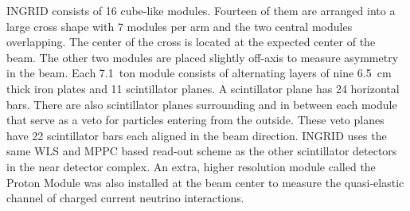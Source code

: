 INGRID consists of 16 cube-like modules. Fourteen of them are arranged
into a large cross shape with 7 modules per arm and the two central
modules overlapping. The center of the cross is located at the
expected center of the beam. The other two modules are placed slightly
off-axis to measure asymmetry in the beam. Each 7.1~ton module consists of
alternating layers of nine 6.5~cm thick iron plates and 11
scintillator planes. A scintillator plane has 24 horizontal
bars. There are also scintillator planes surrounding and in between each module that
serve as a veto for particles entering from the outside. These veto
planes have 22 scintillator bars each aligned in the beam
direction. INGRID uses the same WLS and MPPC based read-out scheme as
the other scintillator detectors in the near detector complex. An
extra, higher resolution module called the Proton Module was also installed at the beam center
to measure the quasi-elastic channel of charged current neutrino
interactions. 
